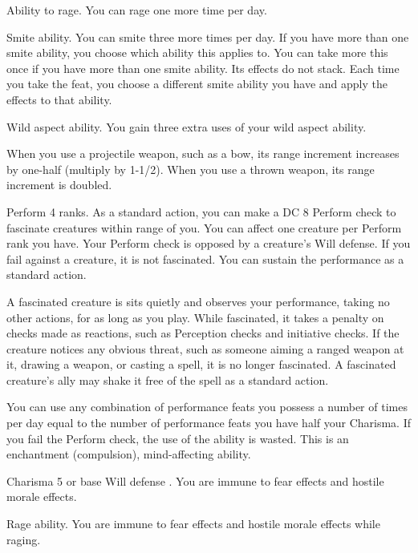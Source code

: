  Ability to rage.
 You can rage one more time per day.

 Smite ability.
 You can smite three more times per day. If you have more than one smite ability, you choose which ability this applies to.
 You can take more this once if you have more than one smite ability. Its effects do not stack. Each time you take the feat, you choose a different smite ability you have and apply the effects to that ability.

 Wild aspect ability.
 You gain three extra uses of your wild aspect ability.

 When you use a projectile weapon, such as a bow, its range increment increases by one-half (multiply by 1-1/2). When you use a thrown weapon, its range increment is doubled.

\featpre Perform 4 ranks.
\featben As a standard action, you can make a DC 8 Perform check to fascinate creatures within \rngmed range of you. You can affect one creature per Perform rank you have. Your Perform check is opposed by a creature's Will defense. If you fail against a creature, it is not fascinated. You can sustain the performance as a standard action.

A fascinated creature is sits quietly and observes your performance, taking no other actions, for as long as you play. While fascinated, it takes a  penalty on checks made as reactions, such as Perception checks and initiative checks. If the creature notices any obvious threat, such as someone aiming a ranged weapon at it, drawing a weapon, or casting a spell, it is no longer fascinated. A fascinated creature's ally may shake it free of the spell as a standard action.

You can use any combination of performance feats you possess a number of times per day equal to the number of performance feats you have \add half your Charisma. If you fail the Perform check, the use of the ability is wasted. This is an enchantment (compulsion), mind-affecting ability.

\featpre Charisma 5 or base Will defense .
\featben You are immune to fear effects and hostile morale effects.

\featpre Rage ability.
\featben You are immune to fear effects and hostile morale effects while raging.

